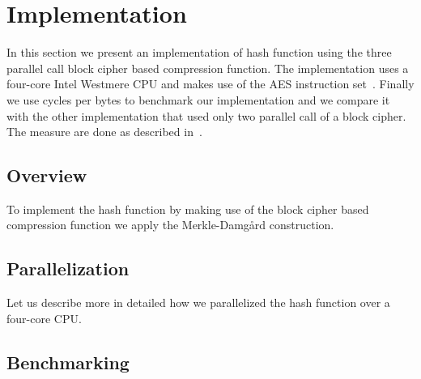 \documentclass[12pt,a4paper]{article}
\begin{document}
\section{Implementation}
In this section we present an implementation of hash function using the three parallel call block cipher based compression function.
The implementation uses a four-core Intel Westmere CPU and makes use of the AES instruction set~\cite{intel-aes}.
Finally we use cycles per bytes to benchmark our implementation and we compare it with the other implementation that used only two parallel call of a block cipher.
The measure are done as described in~\cite{efficient-hash}.
\subsection{Overview}
To implement the hash function by making use of the block cipher based compression function we apply the Merkle-Damg\aa rd construction.

\subsection{Parallelization}
Let us describe more in detailed how we parallelized the hash function over a four-core CPU.
\subsection{Benchmarking}



\end{document}
